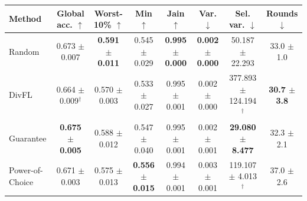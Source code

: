 \begin{tabular}{lccccccc}
\toprule
Method & Global acc. $\uparrow$ & Worst-10\% $\uparrow$ & Min $\uparrow$ & Jain $\uparrow$ & Var. $\downarrow$ & Sel. var. $\downarrow$ & Rounds $\downarrow$ \\
\midrule
Random & 0.673 $\pm$ 0.007 & \textbf{0.591 $\pm$ 0.011} & 0.545 $\pm$ 0.029 & \textbf{0.995 $\pm$ 0.000} & \textbf{0.002 $\pm$ 0.000} & 50.187 $\pm$ 22.293 & 33.0 $\pm$ 1.0 \\
DivFL & 0.664 $\pm$ 0.009$^\dagger$ & 0.570 $\pm$ 0.003 & 0.533 $\pm$ 0.027 & 0.995 $\pm$ 0.001 & 0.002 $\pm$ 0.000 & 377.893 $\pm$ 124.194$^\dagger$ & \textbf{30.7 $\pm$ 3.8} \\
Guarantee & \textbf{0.675 $\pm$ 0.005} & 0.588 $\pm$ 0.012 & 0.547 $\pm$ 0.040 & 0.995 $\pm$ 0.001 & 0.002 $\pm$ 0.001 & \textbf{29.080 $\pm$ 8.477} & 32.3 $\pm$ 2.1 \\
Power-of-Choice & 0.671 $\pm$ 0.003 & 0.575 $\pm$ 0.013 & \textbf{0.556 $\pm$ 0.015} & 0.994 $\pm$ 0.001 & 0.003 $\pm$ 0.001 & 119.107 $\pm$ 4.013$^\dagger$ & 37.0 $\pm$ 2.6 \\
\bottomrule
\end{tabular}
